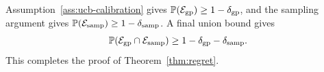 Assumption~\ref{ass:ucb-calibration} gives $\mathbb{P}(\mathcal E_{\rm gp})\ge1-\delta_{\rm gp}$, and the sampling
argument gives $\mathbb{P}(\mathcal E_{\rm samp})\ge1-\delta_{\rm samp}$. A final union bound gives
\[
\mathbb{P}(\mathcal E_{\rm gp}\cap\mathcal E_{\rm samp})
\ge
1-\delta_{\rm gp}-\delta_{\rm samp}.
\]
This completes the proof of Theorem~\ref{thm:regret}.
